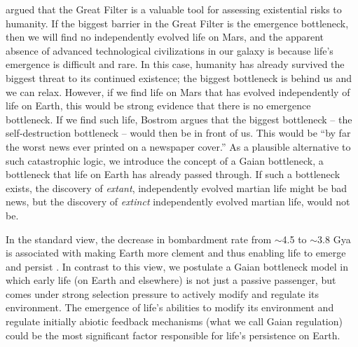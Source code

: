 \citet{Bostrom2008} argued that the Great Filter is a valuable tool for assessing existential risks to humanity. If the biggest barrier in the Great Filter is the emergence bottleneck, then we will find no independently evolved life on Mars, and the apparent absence of 
advanced technological civilizations in our galaxy is because life's emergence is difficult and rare. %
In this case, humanity has already survived the biggest threat to its continued existence; the biggest bottleneck is behind us and we can relax.
However, if we find life on Mars that has evolved independently of life on Earth, this would be strong evidence that there is no
emergence bottleneck. If we find such life, Bostrom argues that the biggest bottleneck -- the self-destruction bottleneck -- would then be in front of us. This would be ``by far the worst news ever printed on a newspaper cover.''
As a plausible alternative to such catastrophic logic, we introduce the concept of a Gaian bottleneck, a bottleneck that life on Earth has already passed through. 
If such a bottleneck exists, the discovery of \textit{extant}, independently evolved martian life might be bad news, but the discovery of \textit{extinct} independently evolved martian life, would not be.

In the standard view, the decrease in bombardment rate  from $\sim$4.5 to $\sim$3.8 Gya is associated with making Earth more clement and thus enabling life to emerge and persist \citep{Maher1988}.
In contrast to this view, we postulate  
a Gaian bottleneck model in which early life (on Earth and elsewhere) is not just a passive passenger, but comes under strong selection pressure
to actively modify and regulate its environment. 
The emergence of life's abilities to modify its environment and regulate initially abiotic feedback mechanisms (what we call Gaian regulation)
could be the most significant factor responsible for life's persistence on Earth.

